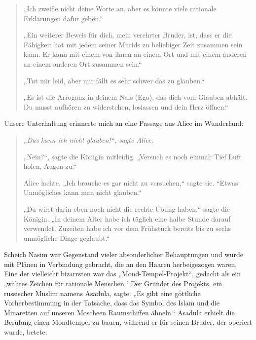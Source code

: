 \documentclass[12pt]{memoir}
\begin{document}
\begin{quote}
„Ich zweifle nicht deine Worte an,
aber es könnte viele rationale Erklärungen dafür geben.“

„Ein weiterer Beweis für dich, mein verehrter Bruder, ist,
dass er die Fähigkeit hat mit jedem seiner Murids
zu beliebiger Zeit zusammen sein kann.
Er kann mit einem von ihnen an einem Ort und mit einem anderen
an einem anderen Ort zusammen sein.“

„Tut mir leid, aber mir fällt es sehr schwer das zu glauben.“

„Es ist die Arroganz in deinem Nafs (Ego), das dich vom Glauben abhält.
Du musst aufhören zu widerstehen, loslassen und dein Herz öffnen.“
\end{quote}

Unsere Unterhaltung erinnerte mich an eine Passage aus Alice im Wunderland:

\begin{quote}
\itshape
„Das kann ich nicht glauben!“, sagte Alice.

„Nein?“, sagte die Königin mitleidig.
„Versuch es noch einmal: Tief Luft holen, Augen zu.“

Alice lachte. „Ich brauche es gar nicht zu versuchen,“ sagte sie.
“Etwas Unmögliches kann man nicht glauben.“

„Du wirst darin eben noch nicht die rechte Übung haben,“ sagte die Königin.
„In deinem Alter habe ich täglich eine halbe Stunde darauf verwendet.
Zuzeiten habe ich vor dem Frühstück
bereits bis zu sechs unmögliche Dinge geglaubt.“
\end{quote}

Scheich Nasim war Gegenstand vieler absonderlicher Behauptungen
und wurde mit Plänen in Verbindung gebracht,
die an den Haaren herbeigezogen waren.
Eine der vielleicht bizarrsten war das „Mond-Tempel-Projekt“,
gedacht als ein „wahres Zeichen für rationale Menschen.“
Der Gründer des Projekts, ein russischer Muslim namens Asadula, sagte:
„Es gibt eine göttliche Vorherbestimmung in der Tatsache,
dass das Symbol des Islam und die Minaretten
auf unseren Moscheen Raumschiffen ähneln.“
Asadula erhielt die Berufung einen Mondtempel zu bauen,
während er für seinen Bruder, der operiert wurde, betete:
\end{document}
